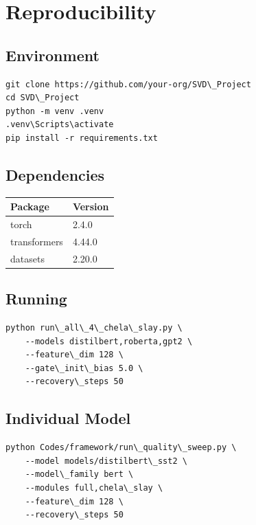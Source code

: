 \section{Reproducibility}

\subsection{Environment}

\begin{lstlisting}
git clone https://github.com/your-org/SVD\_Project
cd SVD\_Project
python -m venv .venv
.venv\Scripts\activate
pip install -r requirements.txt
\end{lstlisting}

\subsection{Dependencies}

\begin{table}[H]
\centering
\small
\begin{tabular}{ll}
\toprule
\textbf{Package} & \textbf{Version} \\
\midrule
torch & 2.4.0 \\
transformers & 4.44.0 \\
datasets & 2.20.0 \\
\bottomrule
\end{tabular}
\end{table}

\subsection{Running}

\begin{lstlisting}
python run\_all\_4\_chela\_slay.py \
    --models distilbert,roberta,gpt2 \
    --feature\_dim 128 \
    --gate\_init\_bias 5.0 \
    --recovery\_steps 50
\end{lstlisting}

\subsection{Individual Model}

\begin{lstlisting}
python Codes/framework/run\_quality\_sweep.py \
    --model models/distilbert\_sst2 \
    --model\_family bert \
    --modules full,chela\_slay \
    --feature\_dim 128 \
    --recovery\_steps 50
\end{lstlisting}


